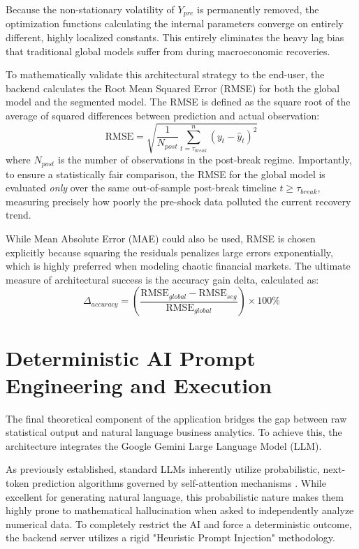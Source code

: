 \documentclass[11pt, a4paper]{report}
\begin{document}
Because the non-stationary volatility of $Y_{pre}$ is permanently removed, the optimization functions calculating the internal parameters converge on entirely different, highly localized constants. This entirely eliminates the heavy lag bias that traditional global models suffer from during macroeconomic recoveries.

To mathematically validate this architectural strategy to the end-user, the backend calculates the Root Mean Squared Error (RMSE) for both the global model and the segmented model. The RMSE is defined as the square root of the average of squared differences between prediction and actual observation:
\begin{equation}
    \text{RMSE} = \sqrt{ \frac{1}{N_{post}} \sum_{t=\tau_{break}}^{n} (y_t - \hat{y}_t)^2 }
\end{equation}
where $N_{post}$ is the number of observations in the post-break regime. Importantly, to ensure a statistically fair comparison, the RMSE for the global model is evaluated \textit{only} over the same out-of-sample post-break timeline $t \ge \tau_{break}$, measuring precisely how poorly the pre-shock data polluted the current recovery trend. 

While Mean Absolute Error (MAE) could also be used, RMSE is chosen explicitly because squaring the residuals penalizes large errors exponentially, which is highly preferred when modeling chaotic financial markets. The ultimate measure of architectural success is the accuracy gain delta, calculated as:
\begin{equation}
    \Delta_{accuracy} = \left( \frac{\text{RMSE}_{global} - \text{RMSE}_{seg}}{\text{RMSE}_{global}} \right) \times 100\%
\end{equation}

\section{Deterministic AI Prompt Engineering and Execution}
The final theoretical component of the application bridges the gap between raw statistical output and natural language business analytics. To achieve this, the architecture integrates the Google Gemini Large Language Model (LLM). 

As previously established, standard LLMs inherently utilize probabilistic, next-token prediction algorithms governed by self-attention mechanisms \cite{Vaswani2017}. While excellent for generating natural language, this probabilistic nature makes them highly prone to mathematical hallucination when asked to independently analyze numerical data. To completely restrict the AI and force a deterministic outcome, the backend server utilizes a rigid "Heuristic Prompt Injection" methodology. 
\end{document}

